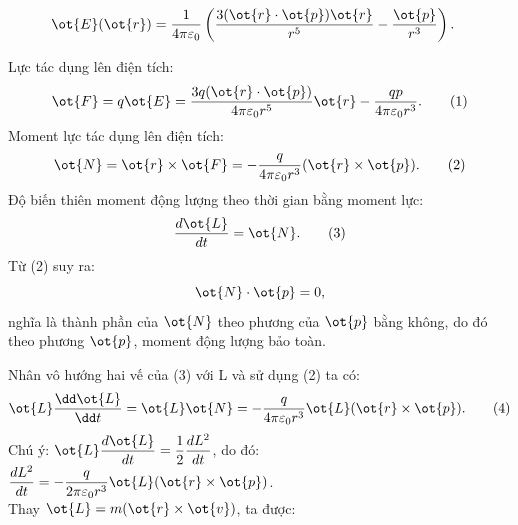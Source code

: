 \begin{loigiai}
\begin{enumerate}[1)]
\[\begin{aligned}
            \ot{{E}}(\ot{{r}}&)=\dfrac{1}{4\pi {{\varepsilon }_{0}}}\left( \dfrac{3(\ot{r}\cdot \ot{p})\ot{{r}}}{{{{r}}^{5}}}-\dfrac{\ot{{p}}}{{{{r}}^{3}}} \right).
            \end{aligned} \]
        \begin{enumerate}
            Lực tác dụng lên điện tích: \[\ot{{F}}={q}\ot{{E}}=\dfrac{3{q}(\ot{{r}} \cdot \ot{{p}})}{4\pi {{\varepsilon }_{0}}{{{r}}^{5}}}\ot{{r}}-\dfrac{{qp}}{4\pi {{\varepsilon }_{0}}{{{r}}^{3}}}.\tag{1}\]	
            Moment lực tác dụng lên điện tích: \[\ot{{N}}=\ot{{r}}\times \ot{{F}}=-\dfrac{{q}}{4\pi {{\varepsilon }_{0}}{{{r}}^{3}}}(\ot{{r}}\times \ot{{p}}).	\tag{2}\]
            Độ biến thiên moment động lượng theo thời gian bằng moment lực: \[\dfrac{{d}\ot{{L}}}{{dt}}=\ot{{N}}. \tag{3}\]
            Từ (2) suy ra: \[\ot{{N}}\cdot \ot{{p}}=0,\] nghĩa là thành phần của $\ot{{N}}$ theo phương của $\ot{{p}}$ bằng không, do đó theo phương $\ot{{p}}$, moment động lượng bảo toàn. 
            
            Nhân vô hướng hai vế của (3) với L và sử dụng (2) ta có:
            \[\ot{{L}}\dfrac{{\dd}\ot{{L}}}{{\dd t}}=\ot{{L}}\ot{{N}}=-\dfrac{{q}}{4\pi {{\varepsilon }_{0}}{{{r}}^{3}}}\ot{{L}}(\ot{{r}}\times \ot{{p}}). \tag{4}\]
            Chú ý: $\ot{{L}}\dfrac{{d}\ot{{L}}}{{dt}}=\dfrac{1}{2}\dfrac{{d}{{{L}}^{2}}}{{dt}}$, do đó: $\dfrac{{d}{{{L}}^{2}}}{{dt}}=-\dfrac{{q}}{2\pi {{\varepsilon }_{0}}{{{r}}^{3}}}\ot{{L}}(\ot{{r}}\times \ot{{p}})$.
            \\Thay $\ot{{L}}={m}(\ot{{r}}\times \ot{{v}})$, ta được:
            

\end{enumerate}
\end{enumerate}
\end{loigiai}
